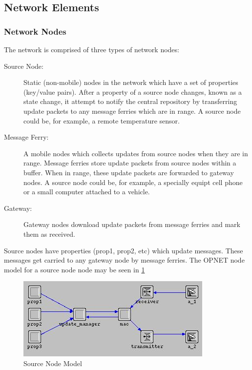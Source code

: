 \subsection{Network Elements}
\label{sec:net_element}


\subsubsection{Network Nodes}

The network is comprised of three types of network nodes:

\begin{description}

\item[Source Node: ] 
Static (non-mobile) nodes in the network which have a set of properties (key/value pairs).
After a property of a source node changes, known as a state change, it attempt to notify the central repository by transferring update packets to any message ferries which are in range.
A source node could be, for example, a remote temperature sensor.
\item[Message Ferry: ] 
A mobile nodes which collects updates from source nodes when they are in range.
Message ferries store update packets from source nodes within a buffer. 
When in range, these update packets are forwarded to gateway nodes.
A source node could be, for example, a specially equipt cell phone or a small computer attached to a vehicle. 
\item[Gateway: ]
Gateway nodes download update packets from message ferries and mark them as received.
\end{description}

Source nodes have properties (prop1, prop2, etc) which update messages. 
These messages get carried to any gateway node by message ferries. 
The OPNET node model for a source node node may be seen in \ref{fig:source}

\begin{figure}[h]
    \centering
    \includegraphics[width=.7\textwidth]{images/source}
    \caption{Source Node Model}
    \label{fig:source}
\end{figure}

